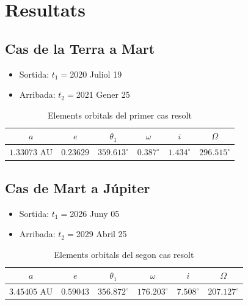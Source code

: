 \chapter{Resultats}

\section{Cas de la Terra a Mart}
\begin{itemize}
	\item Sortida: $t_{1}=$2020 Juliol 19
	\item Arribada: $t_{2}=$2021 Gener 25
\end{itemize}
\begin{table}[h!]
	\centering
	\begin{tabular}{ |c|c|c|c|c|c|}
		\hline
		$a$ & $e$ & $\theta_{1}$ & $\omega$ & $i$ & $\Omega$ \\ \hline
		$1.33073$ AU  & $0.23629$ & $359.613^{\circ}$ & $0.387^{\circ}$ & $1.434^{\circ}$ & $296.515^{\circ}$ \\ \hline
	\end{tabular}
	\caption{Elements orbitals del primer cas resolt}
\end{table}

\section{Cas de Mart a Júpiter}
\begin{itemize}
	\item Sortida: $t_{1}=$2026 Juny 05
	\item Arribada: $t_{2}=$2029 Abril 25
\end{itemize}
\begin{table}[h!]
	\centering
	\begin{tabular}{ |c|c|c|c|c|c|}
		\hline
		$a$ & $e$ & $\theta_{1}$ & $\omega$ & $i$ & $\Omega$ \\ \hline
		$3.45405$ AU  & $0.59043$ & $356.872^{\circ}$ & $176.203^{\circ}$ & $7.508^{\circ}$ & $207.127^{\circ}$ \\ \hline
	\end{tabular}
	\caption{Elements orbitals del segon cas resolt}
\end{table}

